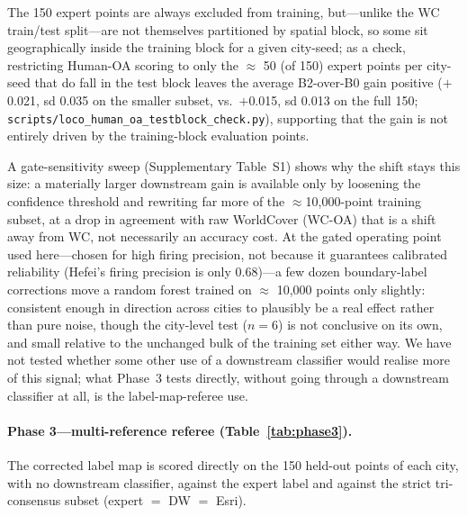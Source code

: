 \documentclass[remotesensing,article,submit,moreauthors]{Definitions/mdpi}
\begin{document}
The 150 expert points are always excluded from
training, but---unlike the WC train/test split---are not themselves
partitioned by spatial block, so some sit geographically inside the training
block for a given city-seed; as a check, restricting Human-OA scoring to
only the $\approx$ 50 (of 150) expert points per city-seed that do fall in
the test block leaves the average B2-over-B0 gain positive ($+$0.021, sd
0.035 on the smaller subset, vs.\ $+$0.015, sd 0.013 on the full 150;
\texttt{scripts/loco\_human\_oa\_testblock\_check.py}), supporting that the
gain is not entirely driven by the training-block evaluation points.

A
gate-sensitivity sweep (Supplementary Table~S1) shows why the shift stays
this size: a materially larger downstream gain is available only by
loosening the confidence threshold and rewriting far more of the
$\approx$10,000-point training subset, at a drop in agreement with raw
WorldCover (WC-OA) that is a shift away from WC, not necessarily an accuracy
cost. At the gated operating point used here---chosen for high firing
precision, not because it guarantees calibrated reliability (Hefei's firing
precision is only 0.68)---a few dozen boundary-label corrections move a
random forest trained on $\approx$ 10,000 points only slightly: consistent
enough in direction across cities to plausibly be a real effect rather than
pure noise, though the city-level test ($n = 6$) is not conclusive on its
own, and small relative to the unchanged bulk of the training set either
way. We have not tested whether some other use of a downstream classifier
would realise more of this signal; what Phase~3 tests directly, without
going through a downstream classifier at all, is the label-map-referee use.

\paragraph{Phase 3---multi-reference referee (Table~\ref{tab:phase3}).}
The corrected label map is scored directly on the 150 held-out points of each
city, with no downstream classifier, against the expert label and against the
strict tri-consensus subset (expert $=$ DW $=$ Esri).
\end{document}
